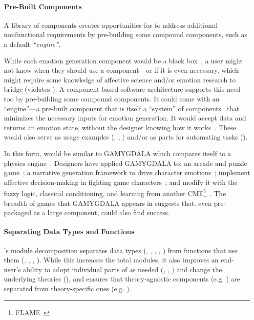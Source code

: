 \paragraph{Pre-Built Components}
A library of components creates opportunities for \progname{} to address
additional nonfunctional requirements by pre-building some compound components,
such as a default \textit{``engine''}. 

While each emotion generation component would be a black 
box~\citep[p.~253]{qian2010software}, a user might not know when they should 
use a component---or if it is even necessary, which might require some 
knowledge of affective science and/or emotion research to bridge (violates 
). A component-based software architecture supports this 
need too by pre-building some compound components. It could come with an 
``engine''---a pre-built component that is itself a ``system'' of 
components~\citep[p.~249]{qian2010software} that minimizes the necessary inputs 
for emotion generation. It would accept data and returns an emotion state, 
without the designer knowing how it 
works~\citep[p.~443]{rodriguez2015computational}. These would also serve as 
usage examples (, , ) 
and/or as parts for automating tasks ().

In this form, \progname{} would be similar to GAMYGDALA which compares itself 
to a physics engine~\citep[p.~32]{popescu2014gamygdala}. Designers have applied 
GAMYGDALA to: an arcade and puzzle game~\citep{broekens2015emotion}; a 
narrative generation framework to drive character 
emotions~\citep{kaptein2015affective}; implement affective decision-making in 
fighting game characters~\citep{yuda2019creating}; and modify it with the fuzzy 
logic, classical conditioning, and learning from another 
CME\footnote{FLAME~\citep{el2000flame}}~\citep[p.~4]{code2015learning}. The 
breadth of games that GAMYGDALA appears in suggests that, even pre-packaged as 
a large component, \progname{} could also find success.

\paragraph{Separating Data Types and Functions}
\progname{}'s module decomposition separates data types (,
, , , ) from
functions that use them (, ,
, ). While this increases the total modules, it
also improves an end-user's ability to adopt individual parts of \progname{} as
needed (, , ) and change the
underlying theories (), and ensures that theory-agnostic
components (e.g. ) are separated from theory-specific ones
(e.g. ).

